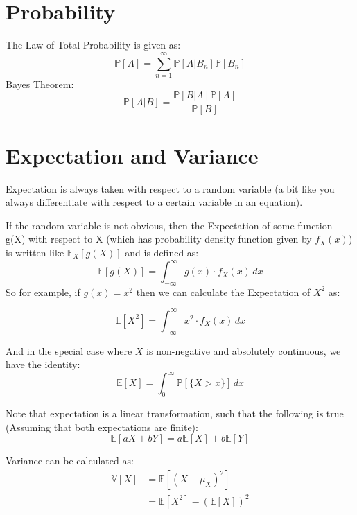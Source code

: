 \section{Probability}
The Law of Total Probability is given as:
\begin{equation*}
    \mathbb{P}[A] = \sum_{n=1}^{\infty} \mathbb{P}[A|B_n] \mathbb{P}[B_n] 
\end{equation*}
Bayes Theorem:
\begin{equation*}
    \mathbb{P}[A | B] = \frac{ \mathbb{P}[B|A] \mathbb{P}[A]  }{ \mathbb{P}[B] }
\end{equation*}




\section{Expectation and Variance}
Expectation is always taken with respect to a random variable (a bit like you
always differentiate with respect to a certain variable in an equation). 

If the random variable is not obvious, then the Expectation of some function
g(X) with respect to X (which has probability density function given by
$f_X(x)$) is written like $\mathbb{E}_X[g(X)]$ and is defined as:
\begin{equation*}
    \mathbb{E}[g(X)] = \int_{-\infty}^{\infty} g(x) \cdot f_X(x) \,dx 
\end{equation*}
So for example, if $g(x) = x^2$ then we can calculate the Expectation of $X^2$
as:

\begin{equation*}
    \mathbb{E}[X^2] = \int_{-\infty}^{\infty} x^2 \cdot f_X(x) \,dx 
\end{equation*}

And in the special case where $X$ is non-negative and absolutely continuous, we
have the identity:
\begin{equation*}
    \mathbb{E}[X] = \int_{0}^{\infty} \mathbb{P}[\{X > x\}]  \,dx 
\end{equation*}

Note that expectation is a linear transformation, such that the following is
true (Assuming that both expectations are finite):
\begin{equation*}
    \mathbb{E}[aX + bY] = a \mathbb{E}[X] + b \mathbb{E}[Y] 
\end{equation*}

Variance can be calculated as: 
\begin{equation*}
    \begin{aligned}
        \mathbb{V}[X] &= \mathbb{E}[\left( X - \mu_X \right)^2]  \\
        &= \mathbb{E}[X^2] - (\mathbb{E}[X])^2 \\
    \end{aligned}
\end{equation*}

